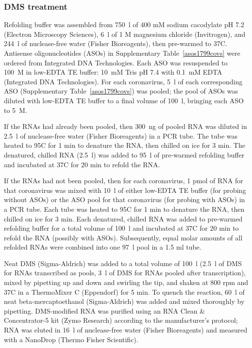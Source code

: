 \documentclass[main.tex]{subfiles}
\begin{document}
\subsubsection{DMS treatment}

Refolding buffer was assembled from 750~\textmu l of 400 mM sodium cacodylate pH 7.2 (Electron Microscopy Sciences), 6~\textmu l of 1 M magnesium chloride (Invitrogen), and 244~\textmu l of nuclease-free water (Fisher Bioreagents), then pre-warmed to 37\textdegree C.
Antisense oligonucleotides (ASOs) in Supplementary Table~\ref{asos1799covs} were ordered from Integrated DNA Technologies.
Each ASO was resuspended to 100~\textmu M in low-EDTA TE buffer: 10~mM Tris pH 7.4 with 0.1~mM EDTA (Integrated DNA Technologies).
For each coronavirus, 5~\textmu l of each corresponding ASO (Supplementary Table~\ref{asos1799covs}) was pooled; the pool of ASOs was diluted with low-EDTA TE buffer to a final volume of 100~\textmu l, bringing each ASO to 5~\textmu M.

If the RNAs had already been pooled, then 300~ng of pooled RNA was diluted in 2.5~\textmu l of nuclease-free water (Fisher Bioreagents) in a PCR tube.
The tube was heated to 95\textdegree C for 1 min to denature the RNA, then chilled on ice for 3 min.
The denatured, chilled RNA (2.5~\textmu l) was added to 95~\textmu l of pre-warmed refolding buffer and incubated at 37\textdegree C for 20 min to refold the RNA.

If the RNAs had not been pooled, then for each coronavirus, 1 pmol of RNA for that coronavirus was mixed with 10~\textmu l of either low-EDTA TE buffer (for probing without ASOs) or the ASO pool for that coronavirus (for probing with ASOs) in a PCR tube.
Each tube was heated to 95\textdegree C for 1 min to denature the RNA, then chilled on ice for 3 min.
Each denatured, chilled RNA was added to pre-warmed refolding buffer for a total volume of 100~\textmu l and incubated at 37\textdegree C for 20 min to refold the RNA (possibly with ASOs).
Subsequently, equal molar amounts of all refolded RNAs were combined into one 97~\textmu l pool in a 1.5 ml tube.

Neat DMS (Sigma-Aldrich) was added to a total volume of 100~\textmu l (2.5~\textmu l of DMS for RNAs transcribed as pools, 3~\textmu l of DMS for RNAs pooled after transcription), mixed by pipetting up and down and swirling the tip, and shaken at 800 rpm and 37\textdegree C in a ThermoMixer C (Eppendorf) for 5 min.
To quench the reaction, 60~\textmu l of neat beta-mercaptoethanol (Sigma-Aldrich) was added and mixed thoroughly by pipetting.
DMS-modified RNA was purified using an RNA Clean \& Concentrator-5 kit (Zymo Research) according to the manufacturer's protocol; RNA was eluted in 16~\textmu l of nuclease-free water (Fisher Bioreagents) and measured with a NanoDrop (Thermo Fisher Scientific).
\end{document}
